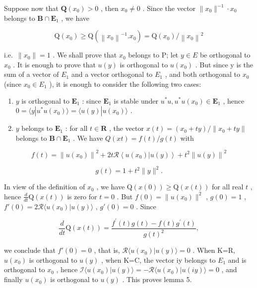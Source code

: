 Suppose now that \(\mathbf{Q}(x_0) > 0\) , then \(x_0 \neq 0\) . Since the vector \(\| x_0 \|^{-1} \cdot x_0\) belongs to \(\mathbf{B} \cap \mathbf{E}_1\) , we have

\[
\mathrm{Q} \left(x _ {0}\right) \geqslant \mathrm{Q} \left(\left\| x _ {0} \right\| ^ {- 1}. x _ {0}\right) = \mathrm{Q} \left(x _ {0}\right) / \left\| x _ {0} \right\| ^ {2}
\]

i.e.~\(\|x_{0}\|=1\) . We shall prove that \(x_{0}\) belongs to P; let \(y\in E\) be orthogonal to \(x_{0}\) . It is enough to prove that \(u(y)\) is orthogonal to \(u(x_{0})\) . But since y is the sum of a vector of \(E_{1}\) and a vector orthogonal to \(E_{1}\) , and both orthogonal to \(x_{0}\) (since \(x_{0}\in E_{1}\) ), it is enough to consider the following two cases:

\begin{enumerate}
\def\labelenumi{\alph{enumi})}
\item
  \(y\) is orthogonal to \(\mathbf{E}_1\) : since \(\mathbf{E}_1\) is stable under \(u^* u, u^* u(x_0) \in \mathbf{E}_1\) , hence \(0 = \langle y | u^* u(x_0) \rangle = \langle u(y) | u(x_0) \rangle\) .
\item
  \(y\) belongs to \(\mathbf{E}_1\) : for all \(t \in \mathbf{R}\) , the vector \(x(t) = (x_0 + ty) / \| x_0 + ty \|\) belongs to \(\mathbf{B} \cap \mathbf{E}_1\) . We have \(Q(xt) = f(t) / g(t)\) with
\end{enumerate}

\[
f (t) = \left\| u (x _ {0}) \right\| ^ {2} + 2 t \mathscr {R} \left\langle u (x _ {0}) | u (y) \right\rangle + t ^ {2} \left\| u (y) \right\| ^ {2}
\]

\[
g (t) = 1 + t ^ {2} \| y \| ^ {2}.
\]

In view of the definition of \(x_0\) , we have \(\mathrm{Q}(x(0)) \geqslant \mathrm{Q}(x(t))\) for all real \(t\) , hence \(\frac{d}{dt} \mathrm{Q}(x(t))\) is zero for \(t = 0\) . But \(f(0) = \| u(x_0)\|^2\) , \(g(0) = 1\) , \(f'(0) = 2\mathcal{R}\langle u(x_0)|u(y)\rangle\) , \(g'(0) = 0\) . Since

\[
\frac {d}{d t} \mathrm{Q} (x (t)) = \frac {f ^ {\prime} (t) g (t) - f (t) g ^ {\prime} (t)}{g (t) ^ {2}},
\]

we conclude that \(f'(0)=0\) , that is, \(\mathcal{R}\langle u(x_{0})|u(y)\rangle=0\) . When K=R, \(u(x_{0})\) is orthogonal to \(u(y)\) , when K=C, the vector iy belongs to \(E_{1}\) and is orthogonal to \(x_{0}\) , hence \(\mathcal{I}\langle u(x_{0})|u(y)\rangle=-\mathcal{R}\langle u(x_{0})|u(iy)\rangle=0\) , and finally \(u(x_{0})\) is orthogonal to \(u(y)\) . This proves lemma 5.

